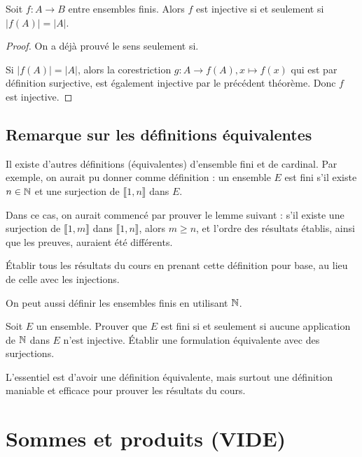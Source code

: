 \begin{corollaire}
Soit $f : A\to B$ entre ensembles finis. Alors $f$ est injective si et seulement si $|f(A)|=|A|$.
\end{corollaire}
\begin{proof}On a déjà prouvé le sens \og seulement si\fg.

Si $|f(A)|=|A|$, alors la corestriction $g : A\to f(A), x\mapsto f(x)$ qui est par définition surjective, est également injective par le précédent théorème. Donc $f$ est injective.
\end{proof}



\subsection{Remarque sur les définitions équivalentes}

Il existe d'autres définitions (équivalentes) d'ensemble fini et de cardinal.
Par exemple, on aurait pu donner comme définition  : un ensemble $E$ est fini s'il existe $n\in \mathbb{N}$ et une surjection de $\llbracket 1,n\rrbracket$ dans $E$.

Dans ce cas, on aurait commencé par prouver le lemme suivant : \og s'il existe une surjection de $\llbracket 1,m\rrbracket$ dans $\llbracket 1,n\rrbracket$, alors $m\geq n$\fg, et l'ordre des résultats établis, ainsi que les preuves, auraient été différents.

\begin{exercice} \'Etablir tous les résultats du cours en prenant  cette définition pour base, au lieu de celle avec les injections.
\end{exercice}

On peut aussi définir les ensembles finis en utilisant $\mathbb{N}$.

\begin{exercice}
Soit $E$ un ensemble.
Prouver que $E$ est fini si et seulement si aucune application de $\mathbb{N}$ dans $E$ n'est injective.
\'Etablir une formulation équivalente avec des surjections.
\end{exercice}

L'essentiel est d'avoir une définition équivalente, mais surtout une définition maniable et efficace pour prouver les résultats du cours.

\section{Sommes et produits (VIDE)}

